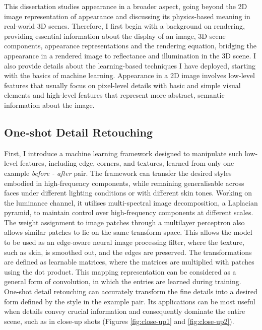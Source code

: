 This dissertation studies appearance in a broader aspect, going beyond the 2D image representation of appearance and discussing its physics-based meaning in real-world 3D scenes. Therefore, I first begin with a background on rendering, providing essential information about the display of an image, 3D scene components, appearance representations and the rendering equation, bridging the appearance in a rendered image to reflectance and illumination in the 3D scene. I also provide details about the learning-based techniques I have deployed, starting with the basics of machine learning. Appearance in a 2D image involves low-level features that usually focus on pixel-level details with basic and simple visual elements and high-level features that represent more abstract, semantic information about the image. 

\subsection{One-shot Detail Retouching}
First, I introduce a machine learning framework designed to manipulate such low-level features, including edge, corners, and textures, learned from only one example \textit{before - after} pair. The framework can transfer the desired styles embodied in high-frequency components, while remaining generalisable across faces under different lighting conditions or with different skin tones. Working on the luminance channel, it utilises multi-spectral image decomposition, a Laplacian pyramid, to maintain control over high-frequency components at different scales. The weight assignment to image patches through a multilayer perceptron also allows similar patches to lie on the same transform space. This allows the model to be used as an edge-aware neural image processing filter, where the texture, such as skin, is smoothed out, and the edges are preserved. The transformations are defined as learnable matrices, where the matrices are multiplied with patches using the dot product. This mapping representation can be considered as a general form of convolution, in which the entries are learned during training. One-shot detail retouching can accurately transform the fine details into a desired form defined by the style in the example pair. Its applications can be most useful when details convey crucial information and consequently dominate the entire scene, such as in close-up shots (Figures \ref{fig:close-up1} and \ref{fig:close-up2}). 




